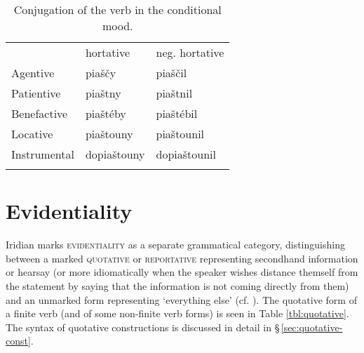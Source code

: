 \begin{table}
    \footnotesize\sffamily
		\caption{Conjugation of the verb  in the conditional mood.}
		\label{tbl:conditional}
		\medskip
    \begin{tabu}to 0.7
         \toprule \addlinespace
         &{\sc hortative}&{\sc neg. hortative}  \\ \addlinespace
         \midrule \addlinespace
         Agentive &
         {piaščy} &
		 {piaščil} \\ \addlinespace

         Patientive &
         {piaštny}&
         {piaštnil}\\ \addlinespace

         Benefactive &
         {piaštéby} &
		 {piaštébil}\\ \addlinespace

         Locative &
         {piaštouny} &
		 {piaštounil}\\ \addlinespace

         Instrumental &
         {dopiaštouny} &
		 {dopiaštounil}\\ \addlinespace

         \bottomrule
    \end{tabu}

\end{table}

\section{Evidentiality}\label{sec:quotative}

Iridian marks {\scshape evidentiality} as a separate grammatical category,
distinguishing between a marked {\scshape quotative} or {\scshape reportative}
representing secondhand information or hearsay (or more idiomatically when the
speaker wishes distance themself from the statement by saying that the
information is not coming directly from them) and an unmarked form representing
`everything else' (cf. \cite[31-33]{aikhenvald2004}). The quotative form of a
finite verb (and of some non-finite verb forms) is seen in Table
\ref{tbl:quotative}. The syntax of quotative constructions is discussed in
detail in \S\,\ref{sec:quotative-const}.


